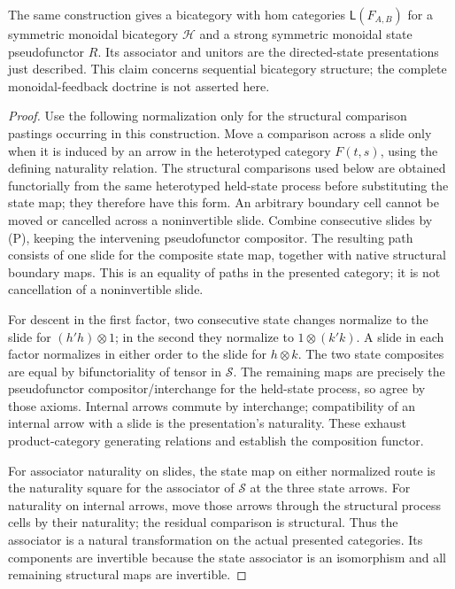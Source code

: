 \documentclass[11pt]{article}
\begin{document}
\begin{proposition}
The same construction gives a bicategory with hom categories $\mathsf L(F_{A,B})$ for a symmetric monoidal bicategory $\mathcal H$ and a strong symmetric monoidal state pseudofunctor $R$. Its associator and unitors are the directed-state presentations just described. This claim concerns sequential bicategory structure; the complete monoidal-feedback doctrine is not asserted here.
\end{proposition}
\begin{proof}
Use the following normalization only for the structural comparison pastings occurring in this construction. Move a comparison across a slide only when it is induced by an arrow in the heterotyped category $F(t,s)$, using the defining naturality relation. The structural comparisons used below are obtained functorially from the same heterotyped held-state process before substituting the state map; they therefore have this form. An arbitrary boundary cell cannot be moved or cancelled across a noninvertible slide. Combine consecutive slides by (P), keeping the intervening pseudofunctor compositor. The resulting path consists of one slide for the composite state map, together with native structural boundary maps. This is an equality of paths in the presented category; it is not cancellation of a noninvertible slide.

For descent in the first factor, two consecutive state changes normalize to the slide for $(h'h)\otimes1$; in the second they normalize to $1\otimes(k'k)$. A slide in each factor normalizes in either order to the slide for $h\otimes k$. The two state composites are equal by bifunctoriality of tensor in $\mathcal S$. The remaining maps are precisely the pseudofunctor compositor/interchange for the held-state process, so agree by those axioms. Internal arrows commute by interchange; compatibility of an internal arrow with a slide is the presentation's naturality. These exhaust product-category generating relations and establish the composition functor.

For associator naturality on slides, the state map on either normalized route is the naturality square for the associator of $\mathcal S$ at the three state arrows. For naturality on internal arrows, move those arrows through the structural process cells by their naturality; the residual comparison is structural. Thus the associator is a natural transformation on the actual presented categories. Its components are invertible because the state associator is an isomorphism and all remaining structural maps are invertible.


\end{proof}
\end{document}
